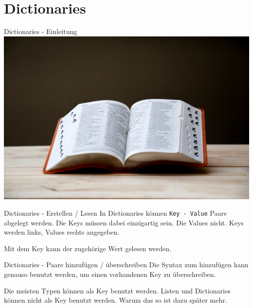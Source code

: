 \section{Dictionaries}
\begin{frame}{Dictionaries - Einleitung}
	\includegraphics[width=\linewidth]{resources/03bool_fun_dict/lexikon.jpeg}
\end{frame}
\begin{frame}{Dictionaries - Erstellen / Lesen}
	In Dictionaries können \alert{\texttt{Key - Value}} Paare abgelegt werden.
	\linebreak
	Die Keys müssen dabei einzigartig sein. Die Values nicht.
	\linebreak
	Keys werden links, Values rechts angegeben.
	
	Mit dem Key kann der zugehörige Wert gelesen werden.
	
\end{frame}
\begin{frame}{Dictionaries - Paare hinzufügen / überschreiben}
	Die Syntax zum hinzufügen kann genauso benutzt werden, um einen vorhandenen Key zu überschreiben.
	
	
	Die meisten Typen können als Key benutzt werden. Listen und Dictionaries können nicht als Key benutzt werden. Warum das so ist dazu später mehr.
	
\end{frame}


